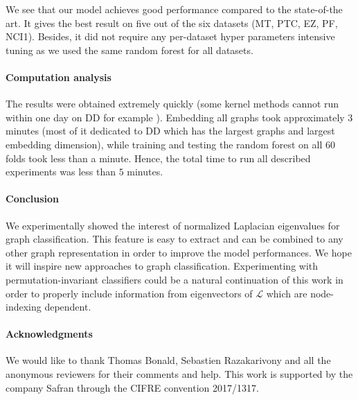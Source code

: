 \documentclass{article}
\begin{document}
We see that our model achieves good performance compared to the state-of-the art. It gives the best result on five out of the six datasets (MT, PTC, EZ, PF, NCI1). Besides, it did not require any per-dataset hyper parameters intensive tuning as we used the same random forest for all datasets.

\paragraph{Computation analysis}

The results were obtained extremely quickly (some kernel methods cannot run within one day on DD for example \citep{dutta2017high}). Embedding all graphs took approximately $3$ minutes
(most of it dedicated to DD which has the largest graphs and largest embedding dimension), while training and testing the random forest on all $60$ folds took less than a minute. Hence, the total time to run all described experiments was less than $5$ minutes.


\paragraph{Conclusion} We experimentally showed the interest of normalized Laplacian eigenvalues for graph classification. This feature is easy to extract and can be combined to any other graph representation in order to improve the model performances. We hope it will inspire new approaches to graph classification. Experimenting with permutation-invariant classifiers \citep{lucas2018mixed, qi2017pointnet} could be a natural continuation of this work in order to properly include information from eigenvectors of $\mathcal{L}$ which are node-indexing dependent.


\paragraph{Acknowledgments}
We would like to thank Thomas Bonald, Sebastien Razakarivony and all the anonymous reviewers for their comments and help. This work is supported by the company Safran through the CIFRE convention 2017/1317.
\end{document}
